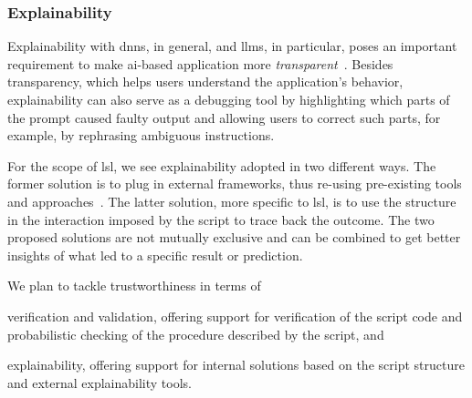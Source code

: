 \documentclass[manuscript,screen]{acmart}
\begin{document}
\subsubsection{Explainability}
\label{sec:explainability}




Explainability with \acp{dnn}, in general, and \acp{llm}, in particular, poses an important requirement to make \ac{ai}-based application more \emph{transparent}~\cite{DBLP:conf/icml/Huang0WWZLGHLZL24}.
Besides transparency, which helps users understand the application's behavior, explainability can also serve as a debugging tool by highlighting which parts of the prompt caused faulty output and allowing users to correct such parts, for example, by rephrasing ambiguous instructions.  %

For the scope of \ac{lsl}, we see explainability adopted in two different ways.
The former solution is to plug in external frameworks, thus re-using pre-existing tools and approaches~\cite{DBLP:journals/tist/ZhaoCYLDCWYD24}.
The latter solution, more specific to \ac{lsl}, is to use the structure in the interaction imposed by the script to trace back the outcome.
The two proposed solutions are not mutually exclusive and can be combined to get better insights of what led to a specific result or prediction.

%
\begin{tcolorbox}[
    title=Trustworthiness, %
    left=1mm,
    right=1mm,
    top=1mm,
    bottom=1mm,
    fonttitle=\bfseries, %
    boxrule=0.5pt, %
    arc=5pt, %
    width=\columnwidth %
]
We plan to tackle trustworthiness in terms of
\begin{enumerate*}[label=(\roman*)]
    \item verification and validation, offering support for verification of the script code and probabilistic checking of the procedure described by the script, and
    \item explainability, offering support for internal solutions based on the script structure and external explainability tools.
\end{enumerate*}

\end{tcolorbox}
\end{document}

